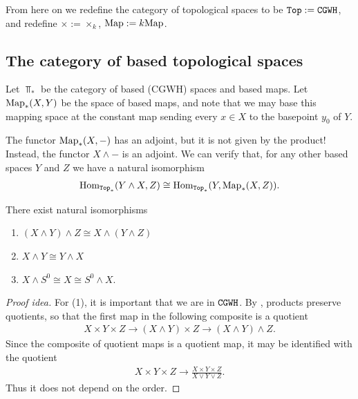 \documentclass{article}[11pt]
\newcommand{\smashprod}{\wedge} %
\begin{document}
\begin{notation} From here on we redefine the category of topological spaces to be $\texttt{Top} := \texttt{CGWH}$, and redefine $\times := \times_k$, $\textup{Map} := k\textup{Map}$. 
\end{notation}

\subsection{The category of based topological spaces}
Let $\Top_\ast$ be the category of based (CGWH) spaces and based maps. Let $\textup{Map}_\ast (X, Y)$ be the space of based maps, and  note that we may base this mapping space at the constant map sending every $x\in X$ to the basepoint $y_0$ of $Y$.

The functor $\textup{Map}_\ast (X, -)$ has an adjoint, but it is not given by the product! Instead, the functor $X\smashprod -$ is an adjoint. We can verify that, for any other based spaces $Y$ and $Z$ we have a natural isomorphism
\begin{align*}
	\Hom_{\Top_\ast} (Y\smashprod X, Z) \cong \Hom_{\Top_\ast} (Y, \Map_\ast (X,Z)).
\end{align*}

\begin{lemma} There exist natural isomorphisms
\begin{enumerate}
	\item $(X\smashprod Y) \smashprod Z \cong X\smashprod (Y\smashprod Z)$
	\item $X\smashprod Y \cong Y\smashprod X$
	\item $X\smashprod S^0 \cong X \cong S^0 \smashprod X$.
\end{enumerate}
\end{lemma}

\begin{proof}[Proof idea] For (1), it is important that we are in $\texttt{CGWH}$. By \cite[Proposition 2.20]{Strickland-cgwh}, products preserve quotients, so that the first map in the following composite is a quotient
\begin{align*}
	X\times Y \times Z \to (X\smashprod Y)\times Z \to (X\smashprod Y)\smashprod Z.
\end{align*}
Since the composite of quotient maps is a quotient map, it may be identified with the quotient
\begin{align*}
	X\times Y \times Z \to \frac{X\times Y\times Z}{X\vee Y\vee Z}.
\end{align*}
Thus it does not depend on the order.

\end{proof}
\end{document}
